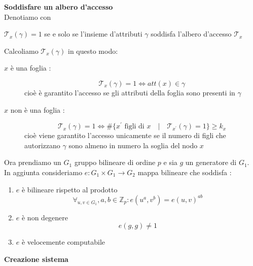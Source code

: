 \vspace{0.2cm}
\textbf{Soddisfare un albero d'accesso}\\
Denotiamo con 
\begin{center}
$\mathcal{T}_x(\gamma) = 1$ se e solo se l'insieme d'attributi $\gamma$ soddisfa l'albero d'accesso $\mathcal{T}_x$
\end{center}
Calcoliamo $\mathcal{T}_x(\gamma)$ in questo modo:
\begin{description}
\item[$x$ è una foglia :] \[\mathcal{T}_x(\gamma) = 1 \Leftrightarrow att(x) \in \gamma\]
cioè è garantito l'accesso se gli attributi della foglia sono presenti in $\gamma$
\item[$x$ non è una foglia :] \[\mathcal{T}_x(\gamma) = 1  \Leftrightarrow \# \{x^\prime \text{ figli di } x \quad|\quad \mathcal{T}_{x^\prime}(\gamma) = 1  \} \geq k_x\]
cioè viene garantito l'accesso unicamente se il numero di figli che autorizzano $\gamma$ sono almeno in numero la soglia del nodo $x$ 
\end{description}

\vspace{0.8cm}

Ora prendiamo un $G_1$ gruppo bilineare di ordine $p$ e sia $g$ un generatore di $G_1$.\\
In aggiunta consideriamo $e : G_1 \times G_1 \rightarrow G_2$ mappa bilineare che soddisfa :
\begin{enumerate}
\item $e$ è bilineare rispetto al prodotto
\[ \forall_{u,v \in G_1}, a,b \in \mathbb{Z}_p : e(u^a,v^b) = e(u,v)^{ab} \]
\item $e$ è non degenere \[e(g,g) \neq 1\]
\item $e$ è velocemente computabile
\end{enumerate}


\vspace{0.8cm}

\textbf{Creazione sistema}

